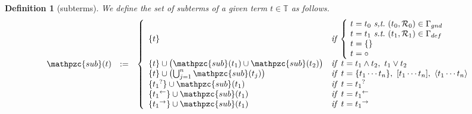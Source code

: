 \documentclass[12pt]{article}
\newtheorem{Definition}{Definition}[section]
\begin{document}
\begin{Definition}[subterms]
  We define the set of subterms of a given term $t \in \mathbb{T}$ as
  follows.
  \begin{displaymath}
    \begin{array}{lll}
      \mathpzc{sub}(t) &:=
      & \left\{ \begin{array}{ll}
          \{t \}  &
           \text{\it if}\;
            \left\{ \! \begin{array}{l}
              t = t_0\ \text{\it s,t.}\
               (t_0, \mathcal{R}_0) \in \Gamma_{gnd}  \\
              t = t_1\ \text{\it s.t.}\
               (t_1, \mathcal{R}_1) \in \Gamma_{def}  \\
              t = \{\}  \\
              t = \circ
            \end{array} \right.  \\
          \{t \} \cup \bigl(\mathpzc{sub}(t_1) \cup \mathpzc{sub}(t_2)
           \bigr)  &
           \text{\it if}\;\; t = t_1 \wedge t_2,\ t_1 \vee t_2  \\
          \{t \} \cup \bigl(\bigcup^{n}_{j=1} \mathpzc{sub}(t_j) \bigr)  &
           \text{\it if}\;\; t = \{t_1 \cdots t_n \},
            \ [t_1 \cdots t_n ], \ \langle t_1 \cdots t_n \rangle  \\
          \{{t_1}^? \} \cup \mathpzc{sub}(t_1)  &
           \text{\it if}\;\; t = {t_1}^?  \\
          \{{t_1}^\leftarrow \} \cup \mathpzc{sub}(t_1)  &
           \text{\it if}\;\; t = {t_1}^\leftarrow \\
          \{{t_1}^\rightarrow \} \cup \mathpzc{sub}(t_1)  &
           \text{\it if}\;\; t = {t_1}^\rightarrow
        \end{array} \right.
    \end{array}
  \end{displaymath}
\end{Definition}
\end{document}
